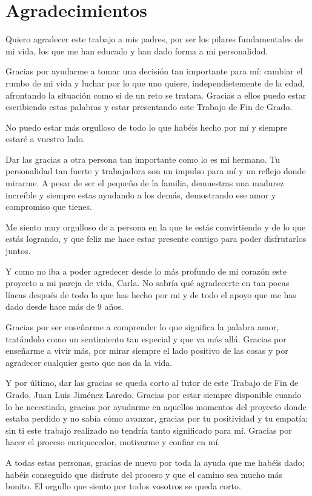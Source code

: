 \chapter*{Agradecimientos}

Quiero agradecer este trabajo a mis padres, por ser los pilares fundamentales de mi vida, los que me han educado y han dado forma a mi personalidad.

Gracias por ayudarme a tomar una decisión tan importante para mí: cambiar el rumbo de mi vida y luchar por lo que uno quiere, independietemente de la edad,
afrontando la situación como si de un reto se tratara. Gracias a ellos puedo estar escribiendo estas palabras y estar presentando este Trabajo de Fin de Grado.

No puedo estar más orgulloso de todo lo que habéis hecho por mí y siempre estaré a vuestro lado.

Dar las gracias a otra persona tan importante como lo es mi hermano. Tu personalidad tan fuerte y trabajadora son un impulso para mí y un reflejo
donde mirarme. A pesar de ser el pequeño de la familia, demuestras una madurez increíble y siempre estas ayudando a los demás, demostrando ese amor y
compromiso que tienes. 

Me siento muy orgulloso de a persona en la que te estás convirtiendo y de lo que estás logrando, y que feliz me hace estar presente contigo para poder disfrutarlos 
juntos.

Y como no iba a poder agredecer desde lo más profundo de mi corazón este proyecto a mi pareja de vida, Carla. No sabría qué agradecerte en tan pocas líneas
después de todo lo que has hecho por mi y de todo el apoyo que me has dado desde hace más de 9 años. 

Gracias por ser enseñarme a comprender lo que significa la palabra amor, tratándolo como un sentimiento tan especial y que va más allá. Gracias por enseñarme a vivir 
más, por mirar siempre el lado positivo de las cosas y por agradecer cualquier gesto que nos da la vida.

Y por último, dar las gracias se queda corto al tutor de este Trabajo de Fin de Grado, Juan Luis Jiménez Laredo. Gracias por estar siempre disponible cuando lo he necestiado,
gracias por ayudarme en aquellos momentos del proyecto donde estaba perdido y no sabía cómo avanzar, gracias por tu positividad y tu empatía; sin ti este trabajo realizado no
tendría tanto significado para mí. Gracias por hacer el proceso enriquecedor, motivarme y confiar en mí.

A todas estas personas, gracias de nuevo por toda la ayuda que me habéis dado; habéis conseguido que disfrute del proceso y que el camino sea mucho más bonito. El orgullo que
siento por todos vosotros se queda corto.

